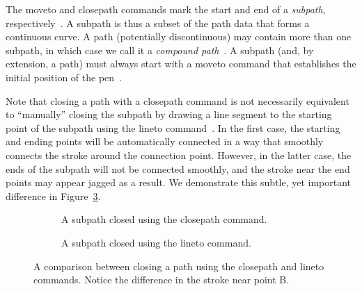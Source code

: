 The moveto and closepath commands mark the start and end of a \emph{subpath}, respectively~\cite[Sec.~8.3]{svg11}. A subpath is thus a subset of the path data that forms a continuous curve. A path (potentially discontinuous) may contain more than one subpath, in which case we call it a \emph{compound path}~\cite[Sec.~8.3.1]{svg11}. A subpath (and, by extension, a path) must always start with a moveto command that establishes the initial position of the pen~\cite[Sec.~8.3.2]{svg11}.

Note that closing a path with a closepath command is not necessarily equivalent to \enquote{manually} closing the subpath by drawing a line segment to the starting point of the subpath using the lineto command~\cite[Sec.~8.3.3]{svg11}. In the first case, the starting and ending points will be automatically connected in a way that smoothly connects the stroke around the connection point. However, in the latter case, the ends of the subpath will not be connected smoothly, and the stroke near the end points may appear jagged as a result. We demonstrate this subtle, yet important difference in Figure~\ref{fig:close-path}.

\begin{figure}[H]
    \centering
    \begin{subfigure}[b]{0.45\textwidth}
        \centering
        \caption{A subpath closed using the closepath command.}
        \label{fig:close-path-correct}
    \end{subfigure}
    \hfill
    \begin{subfigure}[b]{0.45\textwidth}
        \centering
        \caption{A subpath closed using the lineto command.}
        \label{fig:close-path-incorrect}
    \end{subfigure}
    \caption{A comparison between closing a path using the closepath and lineto commands. Notice the difference in the stroke near point B.}
    \label{fig:close-path}
\end{figure}

